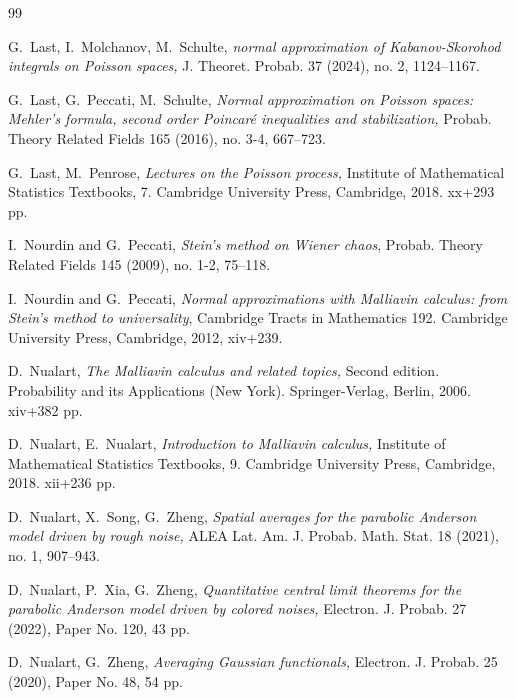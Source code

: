 \documentclass[letterpaper, 11pt,  reqno]{amsart}
\numberwithin{equation}{section}
\numberwithin{theorem}{section}
\begin{document}
\begin{thebibliography}{99}

G.~Last, I.~Molchanov, M.~Schulte,
{\it normal approximation of Kabanov-Skorohod integrals on Poisson spaces,}
J. Theoret. Probab. 37 (2024), no. 2, 1124--1167.




G.~Last,  G.~Peccati,  M.~Schulte,
{\it  Normal approximation on Poisson spaces:
Mehler's formula, second order Poincar\'e inequalities and stabilization,}
Probab. Theory Related Fields  165 (2016), no. 3-4, 667--723.


G.~Last,  M.~Penrose,
{\it Lectures on the Poisson process,}
Institute of Mathematical Statistics Textbooks, 7.
Cambridge University Press, Cambridge, 2018. xx+293 pp.


I.~Nourdin and G.~Peccati, 
{\it Stein's method on Wiener chaos},
Probab. Theory Related Fields 145 (2009), no. 1-2, 75--118.
 
 
 

I.~Nourdin and G.~Peccati, 
{\it Normal approximations with Malliavin calculus: 
from Stein's method to universality}, 
Cambridge Tracts in Mathematics 192. Cambridge University Press,
Cambridge, 2012, xiv+239.


   
D.~Nualart,
{\it   The Malliavin calculus and related topics,}
Second edition. Probability and its Applications (New York).
Springer-Verlag, Berlin, 2006. xiv+382 pp.


D.~Nualart,  E.~Nualart,
{\it  Introduction to Malliavin calculus,}
Institute of Mathematical Statistics Textbooks, 9.
Cambridge University Press, Cambridge, 2018. xii+236 pp.




D.~Nualart,   X.~Song,  G.~Zheng,
{\it  Spatial averages for the parabolic Anderson model
driven by rough noise,}
ALEA Lat. Am. J. Probab. Math. Stat. 18 (2021), no. 1, 907--943.






D.~Nualart, P.~Xia, G.~Zheng,
 {\it  Quantitative central limit theorems
for the parabolic Anderson model driven by colored noises,}
Electron. J. Probab. 27 (2022), Paper No. 120, 43 pp.


 D.~Nualart, G.~Zheng,
{\it Averaging Gaussian functionals,}
  Electron. J. Probab.  25 (2020), Paper No. 48, 54 pp.





\end{thebibliography}
\end{document}
